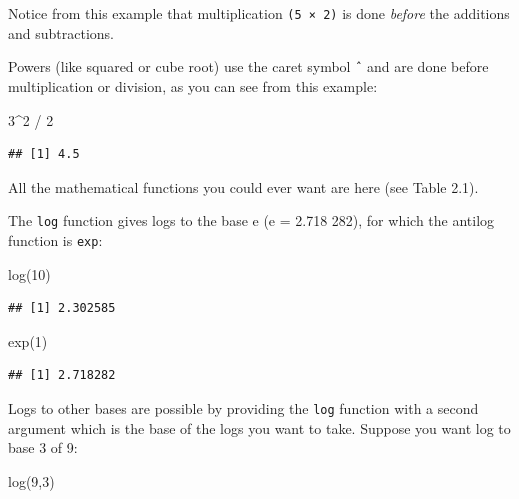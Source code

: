 \documentclass[
]{book}
\newenvironment{Shaded}{\begin{snugshade}}{\end{snugshade}}
\newcommand{\DecValTok}[1]{\textcolor[rgb]{0.00,0.00,0.81}{#1}}
\newcommand{\FunctionTok}[1]{\textcolor[rgb]{0.00,0.00,0.00}{#1}}
\newcommand{\NormalTok}[1]{#1}
\newcommand{\SpecialCharTok}[1]{\textcolor[rgb]{0.00,0.00,0.00}{#1}}
\theoremstyle{definition}
\theoremstyle{definition}
\theoremstyle{definition}
\theoremstyle{definition}
\theoremstyle{remark}
\begin{document}
Notice from this example that multiplication \texttt{(5\ ×\ 2)} is done \emph{before} the additions and subtractions.

Powers (like squared or cube root) use the caret symbol \texttt{ˆ} and are done before multiplication or division, as you can see from this example:

\begin{Shaded}
\begin{Highlighting}[]
\DecValTok{3}\SpecialCharTok{\^{}}\DecValTok{2} \SpecialCharTok{/} \DecValTok{2}
\end{Highlighting}
\end{Shaded}

\begin{verbatim}
## [1] 4.5
\end{verbatim}

All the mathematical functions you could ever want are here (see Table 2.1).

The \texttt{log} function gives logs to the base e (e = 2.718 282), for which the antilog function is \texttt{exp}:

\begin{Shaded}
\begin{Highlighting}[]
\FunctionTok{log}\NormalTok{(}\DecValTok{10}\NormalTok{)}
\end{Highlighting}
\end{Shaded}

\begin{verbatim}
## [1] 2.302585
\end{verbatim}

\begin{Shaded}
\begin{Highlighting}[]
\FunctionTok{exp}\NormalTok{(}\DecValTok{1}\NormalTok{)}
\end{Highlighting}
\end{Shaded}

\begin{verbatim}
## [1] 2.718282
\end{verbatim}

Logs to other bases are possible by providing the \texttt{log} function with a second argument which is the base of the logs you want to take. Suppose you want log to base 3 of 9:

\begin{Shaded}
\begin{Highlighting}[]
\FunctionTok{log}\NormalTok{(}\DecValTok{9}\NormalTok{,}\DecValTok{3}\NormalTok{)}
\end{Highlighting}
\end{Shaded}
\end{document}
